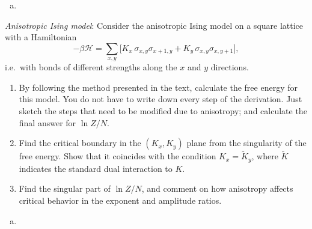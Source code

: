 \begin{solution}
    \begin{enumerate}[(a)]
        \item
    \end{enumerate}
\end{solution}

\begin{problem}
    \textit{Anisotropic Ising model}: Consider the anisotropic Ising model on a square lattice with a Hamiltonian
    \[
        -\beta\mathcal{H} = \sum_{x,y}\bigl[K_x\,\sigma_{x,y}\sigma_{x+1,y} + K_y\,\sigma_{x,y}\sigma_{x,y+1}\bigr],
    \]
    i.e.\ with bonds of different strengths along the $x$ and $y$ directions.

    \begin{enumerate}
        \item[(a)] By following the method presented in the text, calculate the free energy for this model. You do not have to write down every step of the derivation. Just sketch the steps that need to be modified due to anisotropy; and calculate the final answer for $\ln Z/N$.

        \item[(b)] Find the critical boundary in the $(K_x, K_y)$ plane from the singularity of the free energy. Show that it coincides with the condition $K_x = \tilde{K}_y$, where $\tilde{K}$ indicates the standard dual interaction to $K$.

        \item[(c)] Find the singular part of $\ln Z/N$, and comment on how anisotropy affects critical behavior in the exponent and amplitude ratios.
    \end{enumerate}
\end{problem}

\begin{solution}
    \begin{enumerate}[(a)]
        \item
    \end{enumerate}
\end{solution}

